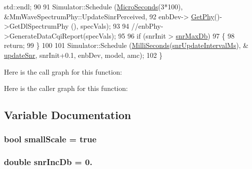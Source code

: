 \begin{DoxyCode}
      std::endl;
90 
91   Simulator::Schedule (\hyperlink{group__timecivil_ga17465a639c8d1464e76538afdd78a9f0}{MicroSeconds}(3*100), &MmWaveSpectrumPhy::UpdateSinrPerceived,
92                                                                                          enbDev->
      \hyperlink{classns3_1_1MmWaveEnbNetDevice_a66bf394e8d7f7c853f4fc6b671f188ca}{GetPhy}()->GetDlSpectrumPhy (), specVals);
93 
94   \textcolor{comment}{//enbPhy->GenerateDataCqiReport(specVals);}
95 
96   \textcolor{keywordflow}{if} (snrInit > \hyperlink{mmwave-amc-test_8cc_aecdd0377f0cae12a929e008201da235d}{snrMaxDb})
97   \{
98         \textcolor{keywordflow}{return};
99   \}
100 
101         Simulator::Schedule (\hyperlink{group__timecivil_gaf26127cf4571146b83a92ee18679c7a9}{MilliSeconds}(\hyperlink{mmwave-amc-test_8cc_a04a74f2767b0e0197ef30e53be3181a9}{snrUpdateIntervalMs}), &
      \hyperlink{mmwave-amc-test_8cc_acbc789d09623d926a18a031079a40297}{updateSnr}, snrInit+0.1, enbDev, model, amc);
102 \}
\end{DoxyCode}


Here is the call graph for this function\+:




Here is the caller graph for this function\+:




\subsection{Variable Documentation}
\subsubsection[{\texorpdfstring{small\+Scale}{smallScale}}]{\setlength{\rightskip}{0pt plus 5cm}bool small\+Scale = true}\hypertarget{mmwave-amc-test_8cc_a204169f2af2a5f81da1189ea236307c8}{}\label{mmwave-amc-test_8cc_a204169f2af2a5f81da1189ea236307c8}
\subsubsection[{\texorpdfstring{snr\+Inc\+Db}{snrIncDb}}]{\setlength{\rightskip}{0pt plus 5cm}double snr\+Inc\+Db = 0.}\hypertarget{mmwave-amc-test_8cc_aaffcb1b1d69f1704e78ffb9b13f3fcca}{}\label{mmwave-amc-test_8cc_aaffcb1b1d69f1704e78ffb9b13f3fcca}
